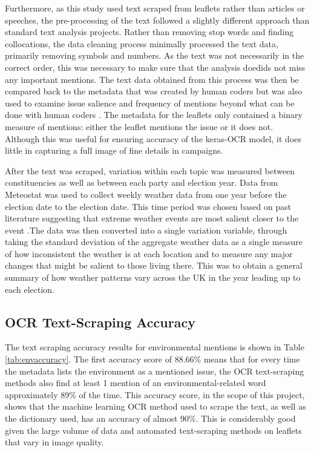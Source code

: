 \documentclass[preprint,12pt,authoryear]{elsarticle}
\begin{document}
Furthermore, as this study used text scraped from leaflets rather than articles or speeches, the pre-processing of the text followed a slightly different approach than standard text analysis projects. Rather than removing stop words and finding collocations, the data cleaning process  minimally processed the text data, primarily removing symbols and numbers. As the text was not necessarily in the correct order, this was necessary to make sure that the analysis doedids not miss any important mentions. The text data obtained from this process was then be compared back to the metadata that was created by human coders but was also used to examine issue salience and frequency of mentions beyond what can be done with human coders \citep{trummParliamentaryCandidatesTheir2023a}. The metadata for the leaflets only contained a binary measure of mentions: either the leaflet mentions the issue or it does not. Although this was useful for ensuring accuracy of the keras-OCR model, it does little in capturing a full image of fine details in campaigns. 
 


After the text was scraped, variation within each topic was measured between constituencies as well as between each party and election year. Data from Meteostat \citep{MeteostatPyPI} was used to collect weekly weather data from one year before the election date to the election date. This time period was chosen based on past literature suggesting that extreme weather events are most salient closer to the event \citep{viscontiEffectDifferentExtreme2024}.The data was then converted into a single variation variable, through taking the standard deviation of the aggregate weather data as a single measure of how inconsistent the weather is at each location and to measure any major changes that might be salient to those living there. This was to obtain a general summary of how weather patterns vary across the UK in the year leading up to each election.



\subsection{OCR Text-Scraping Accuracy}
The text scraping accuracy results for environmental mentions is shown in Table~ \ref{tab:envaccuracy}. The first accuracy score of 88.66\% means that for every time the metadata lists the environment as a mentioned issue, the OCR text-scraping methods also find at least 1 mention of an environmental-related word approximately 89\% of the time. This accuracy score, in the scope of this project, shows that the machine learning OCR method used to scrape the text, as well as the dictionary used, has an accuracy of almost 90\%. This is considerably good given the large volume of data and automated text-scraping methods on leaflets that vary in image quality.
\end{document}
